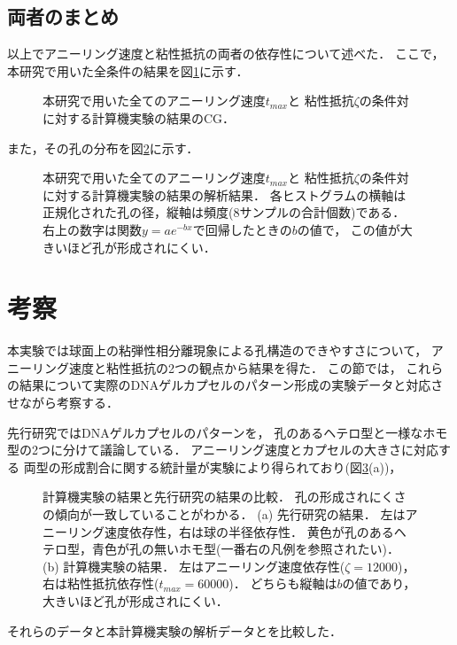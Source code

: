 \subsection{両者のまとめ}
以上でアニーリング速度と粘性抵抗の両者の依存性について述べた．
ここで，本研究で用いた全条件の結果を図\ref{fig:result_sphere_all}に示す．
\begin{figure}
    \centering
    
    \caption{
        本研究で用いた全てのアニーリング速度$t_{max}$と
        粘性抵抗$\zeta$の条件対に対する計算機実験の結果のCG．
    }
\label{fig:result_sphere_all}
\end{figure}
また，その孔の分布を図\ref{fig:result_sphere_all_hist}に示す．
\begin{figure}
    \centering
    
    \caption{
        本研究で用いた全てのアニーリング速度$t_{max}$と
        粘性抵抗$\zeta$の条件対に対する計算機実験の結果の解析結果．
        各ヒストグラムの横軸は正規化された孔の径，縦軸は頻度(8サンプルの合計個数)である．
        右上の数字は関数$y=ae^{-bx}$で回帰したときの$b$の値で，
        この値が大きいほど孔が形成されにくい．
    }
    \label{fig:result_sphere_all_hist}
\end{figure}


\section{考察}
本実験では球面上の粘弾性相分離現象による孔構造のできやすさについて，
アニーリング速度と粘性抵抗の2つの観点から結果を得た．
この節では，
これらの結果について実際のDNAゲルカプセルのパターン形成の実験データと対応させながら考察する．

先行研究ではDNAゲルカプセルのパターンを，
孔のあるヘテロ型と一様なホモ型の2つに分けて議論している．
アニーリング速度とカプセルの大きさに対応する
両型の形成割合に関する統計量が実験により得られており(図\ref{fig:result_moritasan}(a))，
\begin{figure}
    \centering
    
    \caption{
        計算機実験の結果と先行研究の結果の比較．
        孔の形成されにくさの傾向が一致していることがわかる．
        (a) 先行研究の結果．
            左はアニーリング速度依存性，右は球の半径依存性．
            黄色が孔のあるヘテロ型，青色が孔の無いホモ型(一番右の凡例を参照されたい)．
        (b) 計算機実験の結果．
            左はアニーリング速度依存性($\zeta=12000$)，右は粘性抵抗依存性($t_{max}=60000$)．
            どちらも縦軸は$b$の値であり，大きいほど孔が形成されにくい．
    }
    \label{fig:result_moritasan}
\end{figure}
それらのデータと本計算機実験の解析データとを比較した．


